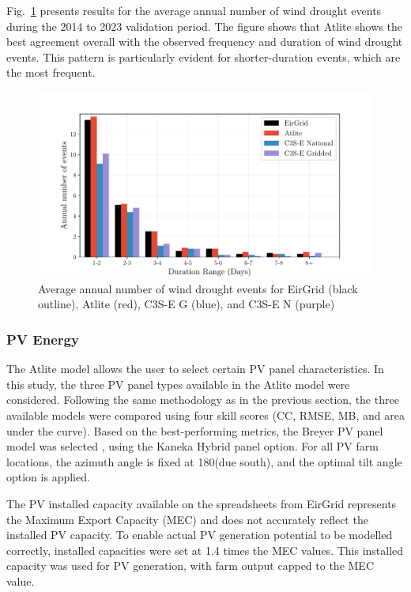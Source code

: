 \documentclass[a4paper, 11pt]{article}
\begin{document}
Fig.~\ref{fig:bar_number_events_verification_wind} presents results for the average annual number of wind drought events during the 2014 to 2023 validation period. The figure shows that Atlite shows the best agreement overall with the observed frequency and duration of wind drought events. This pattern is particularly evident for shorter-duration events, which are the most frequent.

\begin{figure}[!ht]
	\centering
	\includegraphics[width=\textwidth]{verification_wind_bar}
	\caption{Average annual number of wind drought events for EirGrid (black outline), Atlite (red), C3S-E G (blue), and C3S-E N (purple)}
	\label{fig:bar_number_events_verification_wind}
\end{figure}

\newpage
\subsubsection{PV Energy}
\label{sec:pv_verification}

The Atlite model allows the user to select certain PV panel characteristics. In this study, the three PV panel types available in the Atlite model were considered. Following the same methodology as in the previous section, the three available models were compared using four skill scores (CC, RMSE, MB, and area under the curve). Based on the best-performing metrics, the Breyer PV panel model was selected \cite{beyer2004pv}, using the Kaneka Hybrid panel option. For all PV farm locations, the azimuth angle is fixed at 180\textdegree (due south), and the optimal tilt angle option is applied. 

The PV installed capacity available on the spreadsheets from EirGrid represents the Maximum Export Capacity (MEC) and does not accurately reflect the installed PV capacity. To enable actual PV generation potential to be modelled correctly, installed capacities were set at 1.4 times the MEC values. This installed capacity was used for PV generation, with farm output capped to the MEC value.
\end{document}
